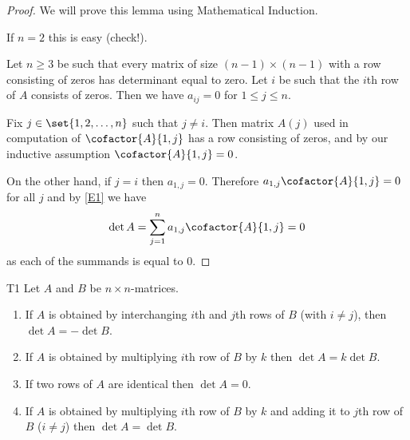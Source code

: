 \begin{proof}
  We will prove this lemma using Mathematical Induction.

  If $n=2$ this is easy (check!).

  Let $n\geq 3$ be such that every matrix of size $(n-1)\times(n-1)$
  with a row consisting of zeros has determinant equal to zero.  Let
  $i$ be such that the $i$th row of $A$ consists of zeros.  Then we
  have $a_{ij}=0$ for $1\leq j\leq n$.

  Fix $j\in \set{1,2, \dots ,n}$ such that $j\neq i$. Then matrix
  $A(j)$ used in computation of $\cofactor{A}{1,j}$ has a row consisting of
  zeros, and by our inductive assumption $\cofactor{A}{1,j}=0$.

  On the other hand, if $j=i$ then $a_{1,j}=0$.  Therefore
  $a_{1,j}\cofactor{A}{1,j}=0$ for all $j$ and by \eqref{E1} we have
  \begin{equation*}
    \det A=\sum_{j=1}^n a_{1,j} \cofactor{A}{1,j}=0
  \end{equation*}
  as each of the summands is equal to 0.
\end{proof}

\begin{theorem}{} {T1}
  Let $A$ and $B$ be $n\times n$-matrices.
  \begin{enumerate}
  \item If $A$ is obtained by interchanging $i$th and $j$th rows of
    $B$ (with $i\neq j$), then $\det A=-\det B$.
  \item If $A$ is obtained by multiplying $i$th row of $B$ by $k$ then
    $\det A=k\det B$.
  \item If two rows of $A$ are identical then $\det A=0$.
  \item If $A$ is obtained by multiplying $i$th row of $B$ by $k$ and
    adding it to $j$th row of $B$ ($i\neq j$) then $\det A=\det B$.
  \end{enumerate}
\end{theorem}

